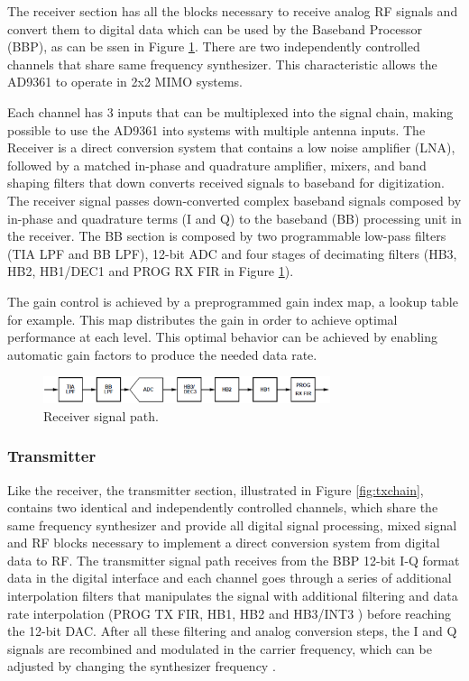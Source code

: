The receiver section has all the blocks necessary to receive analog RF signals
and convert them to digital data which can be used by the Baseband Processor
(BBP), as can be ssen in Figure \ref{fig:rxchain}. There are two independently
controlled channels that share same frequency synthesizer. This characteristic
allows the AD9361 to operate in  2x2 MIMO systems.

Each channel has 3 inputs that can be multiplexed into the signal chain, making
possible to use the AD9361 into systems with multiple antenna inputs. The
Receiver is a direct conversion system that contains a low noise amplifier
(LNA), followed by a matched in-phase and quadrature amplifier, mixers, and band
shaping filters that down converts received signals to baseband for
digitization. The
receiver signal passes down-converted complex baseband signals composed by
in-phase and quadrature terms (I and Q) to the baseband (BB) processing unit in
the receiver. The BB section is composed by two programmable low-pass filters
(TIA LPF and BB LPF), 12-bit ADC and four stages of decimating filters (HB3,
HB2, HB1/DEC1 and PROG RX FIR in Figure \ref{fig:rxchain}).

The gain control is achieved by a preprogrammed gain index map, a lookup table
for example. This map distributes the gain in order to achieve optimal
performance at each level. This optimal behavior can be achieved by enabling
automatic gain factors to produce the needed data rate.

\begin{figure}[htbp]
    \centering
    \includegraphics[width=0.75\textwidth]{./figures/rx_chain}
    \caption{ Receiver signal path.
    \label{fig:rxchain}}
\end{figure}


\subsubsection{Transmitter}

Like the receiver, the transmitter section, illustrated in Figure
\ref{fig:txchain}, contains two identical and independently controlled channels,
which share the same frequency synthesizer and provide all digital signal
processing, mixed signal and RF blocks necessary to implement a direct
conversion system from digital data to RF. The transmitter signal path receives
from the BBP 12-bit I-Q format data in the digital interface and each channel
goes through a series of additional interpolation filters that manipulates the
signal with additional filtering and data rate interpolation (PROG TX FIR, HB1,
HB2 and HB3/INT3 ) before reaching the 12-bit DAC. After all these filtering and
analog conversion steps, the I and Q signals are recombined and modulated in the
carrier frequency, which can be adjusted by changing the synthesizer frequency
\cite{ad:ad9361}.

